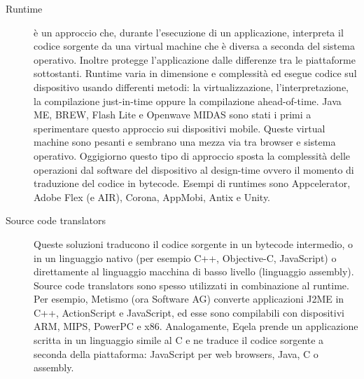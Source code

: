 \begin{description}
\item[Runtime]è un approccio che, durante l'esecuzione di un applicazione, interpreta il codice sorgente da una virtual machine che è diversa a seconda del sistema operativo. Inoltre protegge l'applicazione dalle differenze tra le piattaforme sottostanti. Runtime varia in dimensione e complessità ed esegue codice sul dispositivo usando differenti metodi: la virtualizzazione, l'interpretazione, la compilazione just-in-time oppure la compilazione ahead-of-time. Java ME, BREW, Flash Lite e Openwave MIDAS sono stati i primi a sperimentare questo approccio sui dispositivi mobile. Queste virtual machine sono pesanti e sembrano una mezza via tra browser e sistema operativo. Oggigiorno questo tipo di approccio sposta la complessità delle operazioni dal software del dispositivo al design-time ovvero il momento di traduzione del codice in bytecode. Esempi di runtimes sono Appcelerator, Adobe Flex (e AIR), Corona, AppMobi, Antix e Unity.

\item[Source code translators]
Queste soluzioni traducono il codice sorgente in un bytecode intermedio, o in un linguaggio nativo (per esempio C++, Objective-C, JavaScript) o direttamente al linguaggio macchina di basso livello (linguaggio assembly). Source code translators sono spesso utilizzati in combinazione al runtime. Per esempio, Metismo (ora Software AG) converte applicazioni J2ME in C++, ActionScript e JavaScript, ed esse sono compilabili con dispositivi ARM, MIPS, PowerPC e x86. Analogamente, Eqela prende un applicazione scritta in un linguaggio simile al C e ne traduce il codice sorgente a seconda della piattaforma: JavaScript per web browsers, Java, C o assembly. 
\end{description}

